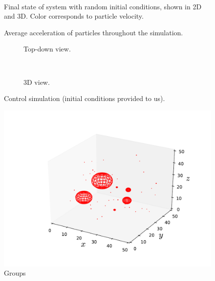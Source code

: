 \documentclass[10pt]{article}
\begin{document}
\begin{figure}[htbp]
\centering
\begin{subfigure}{\textwidth}
\centering

\end{subfigure} \\
\begin{subfigure}{\textwidth}
\centering

\end{subfigure}
\caption{Final state of system with random initial conditions, shown in 2D and 3D. Color corresponds to particle velocity.}
\label{fig:randomic}
\end{figure}

\begin{figure}[htbp]
\centering

\caption{Average acceleration of particles throughout the simulation.}
\label{fig:accel}
\end{figure}


\begin{figure}[htbp]
\centering
\begin{subfigure}{\textwidth}
\centering

\caption{Top-down view.}
\end{subfigure} \\
\begin{subfigure}{\textwidth}
\centering

\caption{3D view.}
\end{subfigure}
\caption{Control simulation (initial conditions provided to us).}
\label{fig:control}
\end{figure}


\begin{figure}[htbp]
\centering
\includegraphics[width=6.2in]{Control_Groups.pdf}
\caption{Groups}
\label{fig:groups}
\end{figure}
\end{document}
